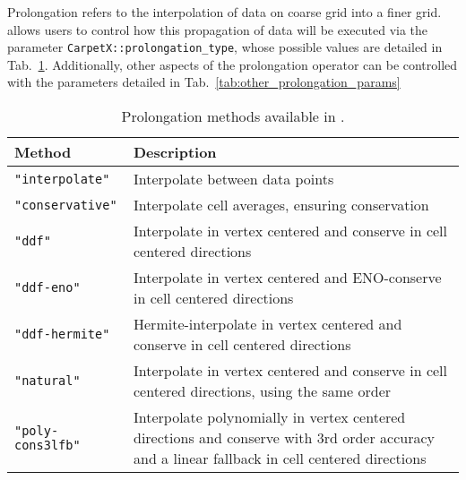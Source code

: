 Prolongation refers to the interpolation of data on coarse grid into a finer grid. \CarpetX\space allows users to control how this propagation of data will be executed via the parameter \texttt{CarpetX::prolongation\_type}, whose possible values are detailed in Tab.~\ref{tab:prolongation_methods}. Additionally, other aspects of the prolongation operator can be controlled with the parameters detailed in Tab.~\ref{tab:other_prolongation_params}

\begin{table}[ht]
  \centering
  \begin{tabularx}{\textwidth}{lX}
    Method                   & Description                                                                                                                                   \\\hline\hline
    \texttt{"interpolate"}   & Interpolate between data points                                                                                                               \\
    \texttt{"conservative"}  & Interpolate cell averages, ensuring conservation                                                                                              \\
    \texttt{"ddf"}           & Interpolate in vertex centered and conserve in cell centered directions                                                                       \\
    \texttt{"ddf-eno"}       & Interpolate in vertex centered and ENO-conserve in cell centered directions                                                                   \\
    \texttt{"ddf-hermite"}   & Hermite-interpolate in vertex centered and conserve in cell centered directions                                                               \\
    \texttt{"natural"}       & Interpolate in vertex centered and conserve in cell centered directions, using the same order                                                 \\
    \texttt{"poly-cons3lfb"} & Interpolate polynomially in vertex centered directions and conserve with 3rd order accuracy and a linear fallback in cell centered directions \\\hline\hline
  \end{tabularx}
  \caption{Prolongation methods available in \CarpetX.}
  \label{tab:prolongation_methods}
\end{table}


